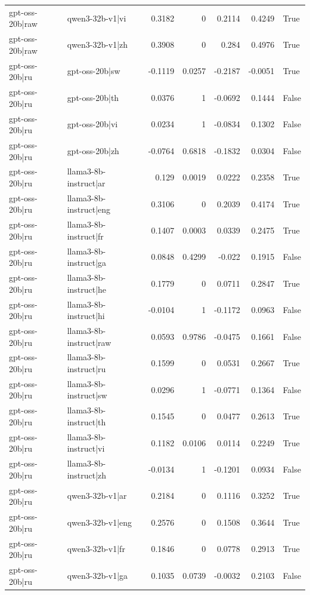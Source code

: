 \begin{table}
\begin{tabular}{l l r r r r l}
gpt-oss-20b|raw & qwen3-32b-v1|vi & 0.3182 & 0 & 0.2114 & 0.4249 & True \\
gpt-oss-20b|raw & qwen3-32b-v1|zh & 0.3908 & 0 & 0.284 & 0.4976 & True \\
gpt-oss-20b|ru & gpt-oss-20b|sw & -0.1119 & 0.0257 & -0.2187 & -0.0051 & True \\
gpt-oss-20b|ru & gpt-oss-20b|th & 0.0376 & 1 & -0.0692 & 0.1444 & False \\
gpt-oss-20b|ru & gpt-oss-20b|vi & 0.0234 & 1 & -0.0834 & 0.1302 & False \\
gpt-oss-20b|ru & gpt-oss-20b|zh & -0.0764 & 0.6818 & -0.1832 & 0.0304 & False \\
gpt-oss-20b|ru & llama3-8b-instruct|ar & 0.129 & 0.0019 & 0.0222 & 0.2358 & True \\
gpt-oss-20b|ru & llama3-8b-instruct|eng & 0.3106 & 0 & 0.2039 & 0.4174 & True \\
gpt-oss-20b|ru & llama3-8b-instruct|fr & 0.1407 & 0.0003 & 0.0339 & 0.2475 & True \\
gpt-oss-20b|ru & llama3-8b-instruct|ga & 0.0848 & 0.4299 & -0.022 & 0.1915 & False \\
gpt-oss-20b|ru & llama3-8b-instruct|he & 0.1779 & 0 & 0.0711 & 0.2847 & True \\
gpt-oss-20b|ru & llama3-8b-instruct|hi & -0.0104 & 1 & -0.1172 & 0.0963 & False \\
gpt-oss-20b|ru & llama3-8b-instruct|raw & 0.0593 & 0.9786 & -0.0475 & 0.1661 & False \\
gpt-oss-20b|ru & llama3-8b-instruct|ru & 0.1599 & 0 & 0.0531 & 0.2667 & True \\
gpt-oss-20b|ru & llama3-8b-instruct|sw & 0.0296 & 1 & -0.0771 & 0.1364 & False \\
gpt-oss-20b|ru & llama3-8b-instruct|th & 0.1545 & 0 & 0.0477 & 0.2613 & True \\
gpt-oss-20b|ru & llama3-8b-instruct|vi & 0.1182 & 0.0106 & 0.0114 & 0.2249 & True \\
gpt-oss-20b|ru & llama3-8b-instruct|zh & -0.0134 & 1 & -0.1201 & 0.0934 & False \\
gpt-oss-20b|ru & qwen3-32b-v1|ar & 0.2184 & 0 & 0.1116 & 0.3252 & True \\
gpt-oss-20b|ru & qwen3-32b-v1|eng & 0.2576 & 0 & 0.1508 & 0.3644 & True \\
gpt-oss-20b|ru & qwen3-32b-v1|fr & 0.1846 & 0 & 0.0778 & 0.2913 & True \\
gpt-oss-20b|ru & qwen3-32b-v1|ga & 0.1035 & 0.0739 & -0.0032 & 0.2103 & False \\

\end{tabular}
\end{table}
